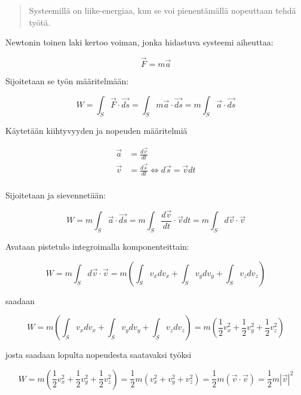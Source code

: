 \documentclass[12pt,a4paper,finnish]{book}
\begin{document}
\begin{quotation}
 Systeemillä on liike-energiaa, kun se voi pienentämällä nopeuttaan tehdä työtä.
\end{quotation}

Newtonin toinen laki kertoo voiman, jonka hidastuva systeemi aiheuttaa:

\begin{equation}
 \vec{F} = m\vec{a}
\end{equation}

Sijoitetaan se työn määritelmään:

\begin{equation}
 W = \int_S \vec{F} \cdot \vec{ds} = \int_S m\vec{a} \cdot \vec{ds} = m\int_S \vec{a} \cdot \vec{ds}
\end{equation}

Käytetään kiihtyvyyden ja nopeuden määritelmiä 

\begin{align}
\vec{a} &= \frac{d\vec{v}}{dt} \\
\vec{v} &= \frac{d\vec{s}}{dt} \Leftrightarrow d\vec{s} =  \vec{v}dt\\
\end{align}

Sijoitetaan ja sievennetään:

\begin{equation}
 W = m\int_S \vec{a} \cdot \vec{ds} = m\int_S \frac{d\vec{v}}{dt} \cdot \vec{v}dt = m\int_S d\vec{v} \cdot \vec{v}
\end{equation}

Avataan pistetulo integroimalla komponenteittain:

\begin{equation}
 W = m\int_S d\vec{v} \cdot \vec{v} = m \left(\int_S v_xdv_x + \int_S v_ydv_y + \int_S v_zdv_z\right)
\end{equation}

saadaan

\begin{equation}
 W = m \left(\int_S v_xdv_x + \int_S v_ydv_y + \int_S v_zdv_z\right) 
 = m \left(\frac{1}{2}v_x^2 + \frac{1}{2}v_y^2 + \frac{1}{2}v_z^2\right)
\end{equation}

josta saadaan lopulta nopeudesta saatavaksi työksi

\begin{equation}
 W = m \left(\frac{1}{2}v_x^2 + \frac{1}{2}v_y^2 + \frac{1}{2}v_z^2\right)
 = \frac{1}{2}m \left(v_x^2 + v_y^2 + v_z^2\right)
 = \frac{1}{2}m (\vec{v} \cdot \vec{v})
 = \frac{1}{2}m|\vec{v}|^2
\end{equation}
\end{document}
